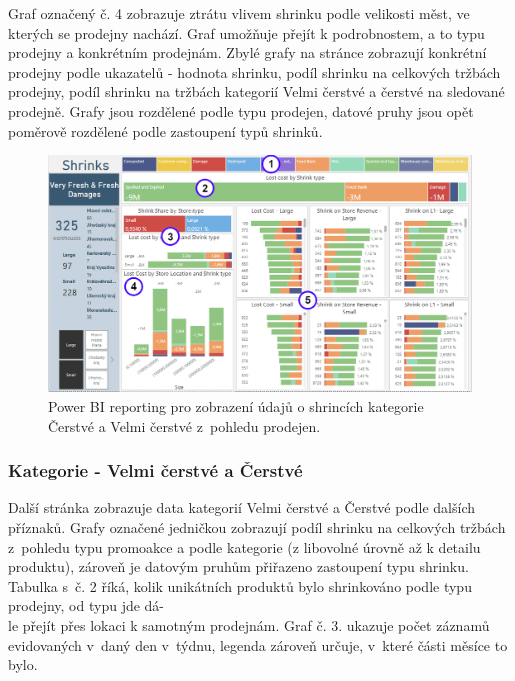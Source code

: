Graf označený č. 4 zobrazuje ztrátu vlivem shrinku podle velikosti měst, ve kterých se prodejny nachází. Graf umožňuje přejít k podrobnostem, a to typu prodejny a konkrétním prodejnám. Zbylé grafy na stránce zobrazují konkrétní prodejny podle ukazatelů - hodnota shrinku, podíl shrinku na celkových tržbách prodejny, podíl shrinku na tržbách kategorií Velmi čerstvé a čerstvé na sledované prodejně. Grafy jsou rozdělené podle typu prodejen, datové pruhy jsou opět poměrově rozdělené podle zastoupení typů shrinků.

\begin{figure}[h!]
    \centering
    \captionsetup{justification=centering}
    \includegraphics[width=\textwidth]{obrazky/PBI/storesSFF.png}
    \caption{Power BI reporting pro zobrazení údajů o shrincích kategorie Čerstvé a Velmi čerstvé z~pohledu prodejen.}
    \label{obr:PBI:storesSFF}
\end{figure}

\subsubsection*{Kategorie - Velmi čerstvé a Čerstvé}

Další stránka zobrazuje data kategorií Velmi čerstvé a Čerstvé podle dalších příznaků. Grafy označené jedničkou zobrazují podíl shrinku na celkových tržbách z~pohledu typu promoakce a podle kategorie (z libovolné úrovně až k detailu produktu), zároveň je datovým pruhům přiřazeno zastoupení typu shrinku. Tabulka s~č. 2 říká, kolik unikátních produktů bylo shrinkováno podle typu prodejny, od typu jde dá-\\le přejít přes lokaci k samotným prodejnám. Graf č. 3. ukazuje počet záznamů evidovaných v~daný den v~týdnu, legenda zároveň určuje, v~které části měsíce to bylo. 

